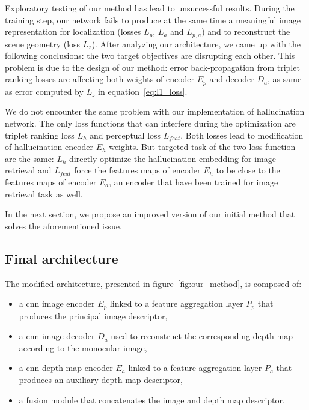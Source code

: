 Exploratory testing of our method has lead to unsuccessful results. During the training step, our network fails to produce at the same time a meaningful image representation for localization (losses $L_p$, $L_a$ and $L_{p,a}$) and to reconstruct the scene geometry (loss $L_z$). After analyzing our architecture, we came up with the following conclusions: the two target objectives are disrupting each other. This problem is due to the design of our method: error back-propagation from triplet ranking losses are affecting both weights of encoder $E_p$ and decoder $D_a$, as same as error computed by $L_z$ in equation~\ref{eq:l1_loss}. 

We do not encounter the same problem with our implementation of hallucination network. The only loss functions that can interfere during the optimization are triplet ranking loss $L_h$ and perceptual loss $L_{feat}$. Both losses lead to modification of hallucination encoder $E_h$ weights. But targeted task of the two loss function are the same: $L_h$ directly optimize the hallucination embedding for image retrieval and $L_{feat}$ force the features maps of encoder $E_h$ to be close to the features maps of encoder $E_a$, an encoder that have been trained for image retrieval task as well.

In the next section, we propose an improved version of our initial method that solves the aforementioned issue.

\subsection{Final architecture}


The modified architecture, presented in figure~\ref{fig:our_method}, is composed of:

\begin{itemize}
	\item a \ac{cnn} image encoder $E_p$ linked to a feature aggregation layer $P_p$ that produces the principal image descriptor,
	\item a \ac{cnn} image decoder $D_a$ used to reconstruct the corresponding depth map according to the monocular image,
	\item a \ac{cnn} depth map encoder $E_a$ linked to a feature aggregation layer $P_a$ that produces an auxiliary depth map descriptor,
	\item a fusion module that concatenates the image and depth map descriptor.
\end{itemize}

